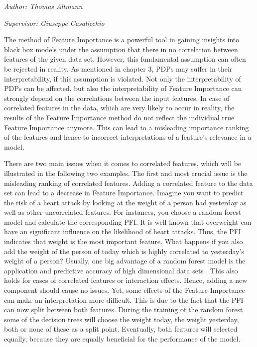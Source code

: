 \documentclass[]{krantz}
\begin{document}
\emph{Author: Thomas Altmann}

\emph{Supervisor: Giuseppe Casalicchio}

The method of Feature Importance is a powerful tool in gaining insights
into black box models under the assumption that there in no correlation
between features of the given data set. However, this fundamental
assumption can often be rejected in reality. As mentioned in chapter 3,
PDPs may suffer in their interpretability, if this assumption is
violated. Not only the interpretability of PDPs can be affected, but
also the interpretability of Feature Importance can strongly depend on
the correlations between the input features. In case of correlated
features in the data, which are very likely to occur in reality, the
results of the Feature Importance method do not reflect the individual
true Feature Importance anymore. This can lead to a misleading
importance ranking of the features and hence to incorrect
interpretations of a feature's relevance in a model.

There are two main issues when it comes to correlated features, which
will be illustrated in the following two examples. The first and most
crucial issue is the misleading ranking of correlated features. Adding a
correlated feature to the data set can lead to a decrease in Feature
Importance. Imagine you want to predict the risk of a heart attack by
looking at the weight of a person had yesterday as well as other
uncorrelated features. For instances, you choose a random forest model
and calculate the corresponding PFI. It is well known that overweight
can have an significant influence on the likelihood of heart attacks.
Thus, the PFI indicates that weight is the most important feature. What
happens if you also add the weight of the person of today which is
highly correlated to yesterday's weight of a person? Usually, one big
advantage of a random forest model is the application and predictive
accuracy of high dimensional data sets \citep{strobl2008}. This also
holds for cases of correlated features or interaction effects. Hence,
adding a new component should cause no issues. Yet, some effects of the
Feature Importance can make an interpretation more difficult. This is
due to the fact that the PFI can now split between both features. During
the training of the random forest some of the decision trees will choose
the weight today, the weight yesterday, both or none of these as a split
point. Eventually, both features will selected equally, because they are
equally beneficial for the performance of the model. \citep{molnar2019}
\end{document}

